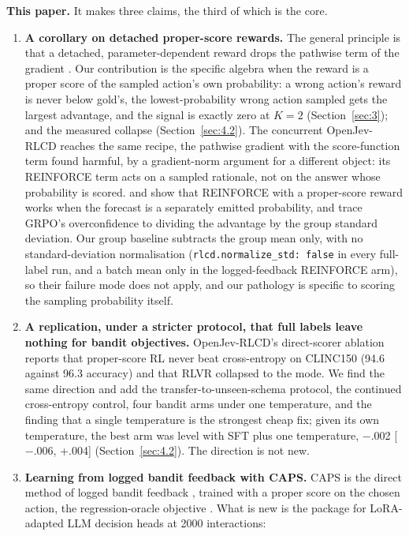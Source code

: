\documentclass[10pt,letterpaper]{article}
\theoremstyle{plain}
\begin{document}
\textbf{This paper.} It makes three claims, the third of which is the core.
\begin{enumerate}
  \item \textbf{A corollary on detached proper-score rewards.} The general principle is that a detached, parameter-dependent reward drops the pathwise term of the gradient \citep{schulman2015scg,mohamed2020montecarlo}. Our contribution is the specific algebra when the reward is a proper score of the sampled action's own probability: a wrong action's reward is never below gold's, the lowest-probability wrong action sampled gets the largest advantage, and the signal is exactly zero at $K = 2$ (Section~\ref{sec:3}); and the measured collapse (Section~\ref{sec:4.2}). The concurrent OpenJev-RLCD \citep{gao2026openjev} reaches the same recipe, the pathwise gradient with the score-function term found harmful, by a gradient-norm argument for a different object: its REINFORCE term acts on a sampled rationale, not on the answer whose probability is scored. \citet{bereket2025uncalibrated} and \citet{damani2025rlcr} show that REINFORCE with a proper-score reward works when the forecast is a separately emitted probability, and \citeauthor{bereket2025uncalibrated} trace GRPO's overconfidence to dividing the advantage by the group standard deviation. Our group baseline subtracts the group mean only, with no standard-deviation normalisation (\texttt{rlcd.normalize\_std: false} in every full-label run, and a batch mean only in the logged-feedback REINFORCE arm), so their failure mode does not apply, and our pathology is specific to scoring the sampling probability itself.
  \item \textbf{A replication, under a stricter protocol, that full labels leave nothing for bandit objectives.} OpenJev-RLCD's direct-scorer ablation reports that proper-score RL never beat cross-entropy on CLINC150 (94.6 against 96.3 accuracy) and that RLVR collapsed to the mode. We find the same direction and add the transfer-to-unseen-schema protocol, the continued cross-entropy control, four bandit arms under one temperature, and the finding that a single temperature is the strongest cheap fix; given its own temperature, the best arm was level with SFT plus one temperature, $-$.002 [$-$.006, +.004] (Section~\ref{sec:4.2}). The direction is not new.
  \item \textbf{Learning from logged bandit feedback with CAPS.} CAPS is the direct method of logged bandit feedback \citep{dudik2011doubly}, trained with a proper score on the chosen action, the regression-oracle objective \citep{foster2018regcb,foster2020squarecb}. What is new is the package for LoRA-adapted LLM decision heads at 2000 interactions:

\end{enumerate}
\end{document}
